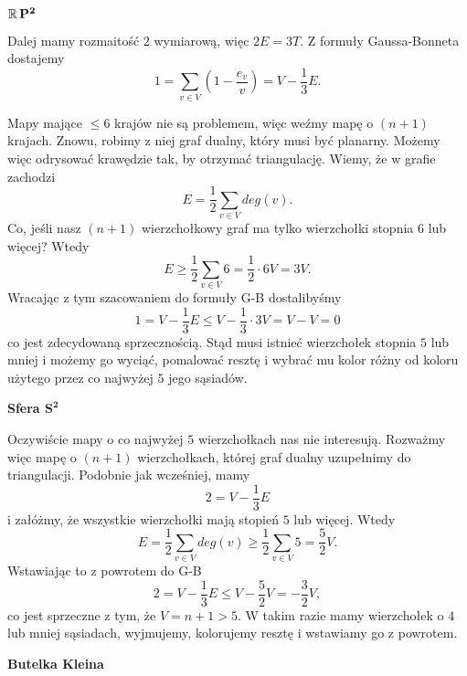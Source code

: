 \begin{enumerate}[label=\textbf{(\alph*)}]
    \textbf{$\mathbf{\operatorname{\mathbb{R}} P^2}$} \dotfill

    Dalej mamy rozmaitość $2$ wymiarową, więc $2E=3T$. Z formuły Gaussa-Bonneta dostajemy
    $$1=\sum_{v\in V}(1-\frac{e_v}{v})=V-\frac{1}{3}E.$$

    Mapy mające $\leq 6$ krajów nie są problemem, więc weźmy mapę o $(n+1)$ krajach. Znowu, robimy z niej graf dualny, który musi być planarny. Możemy więc odrysować krawędzie tak, by otrzymać triangulację. Wiemy, że w grafie zachodzi
    $$E=\frac{1}{2}\sum_{v\in V}deg(v).$$
    Co, jeśli nasz $(n+1)$ wierzchołkowy graf ma tylko wierzchołki stopnia $6$ lub więcej? Wtedy
    $$E\geq \frac{1}{2}\sum_{v\in V}6=\frac{1}{2}\cdot 6V=3V.$$
    Wracając z tym szacowaniem do formuły G-B dostalibyśmy
    $$1=V-\frac{1}{3}E\leq V-\frac{1}{3}\cdot 3V=V-V=0$$
    co jest zdecydowaną sprzecznością. Stąd musi istnieć wierzchołek stopnia $5$ lub mniej i możemy go wyciąć, pomalować resztę i wybrać mu kolor różny od koloru użytego przez co najwyżej $5$ jego sąsiadów.

    \textbf{Sfera $\mathbf{S^2}$} \dotfill

    Oczywiście mapy o co najwyżej $5$ wierzchołkach nas nie interesują. Rozważmy więc mapę o $(n+1)$ wierzchołkach, której graf dualny uzupełnimy do triangulacji. Podobnie jak wcześniej, mamy
    $$2=V-\frac{1}{3}E$$
    i załóżmy, że wszystkie wierzchołki mają stopień $5$ lub więcej. Wtedy
    $$E=\frac{1}{2}\sum_{v\in V}deg(v)\geq \frac{1}{2}\sum_{v\in V}5=\frac{5}{2}V.$$
    Wstawiając to z powrotem do G-B
    $$2=V-\frac{1}{3}E\leq V-\frac{5}{2}V=-\frac{3}{2}V,$$
    co jest sprzeczne z tym, że $V=n+1>5$. W takim razie mamy wierzchołek o $4$ lub mniej sąsiadach, wyjmujemy, kolorujemy resztę i wstawiamy go z powrotem.

    \textbf{Butelka Kleina}


\end{enumerate}
